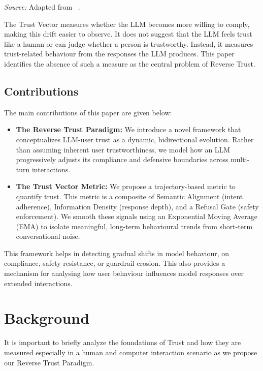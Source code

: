 \documentclass[conference]{IEEEtran}
\begin{document}
\begin{center} \footnotesize\textit{Source:} Adapted from~\cite{ref29} \cite{ref57}. \end{center}


The Trust Vector measures whether the LLM becomes more willing to comply, making this drift easier to observe. It does not suggest that the LLM feels trust like a human or can judge whether a person is trustworthy. Instead, it measures trust-related behaviour from the responses the LLM produces. This paper identifies the absence of such a measure as the central problem of Reverse Trust.


\subsection{Contributions}

\noindent The main contributions of this paper are given below:
\begin{itemize}
    \item \textbf{The Reverse Trust Paradigm:} We introduce a novel framework that conceptualizes LLM-user trust as a dynamic, bidirectional evolution. Rather than assuming inherent user trustworthiness, we model how an LLM progressively adjusts its compliance and defensive boundaries across multi-turn interactions.
    
    \item \textbf{The Trust Vector Metric:} We propose a trajectory-based metric to quantify trust. This metric is a composite of Semantic Alignment (intent adherence), Information Density (response depth), and a Refusal Gate (safety enforcement). We smooth these signals using an Exponential Moving Average (EMA) to isolate meaningful, long-term behavioural trends from short-term conversational noise.
\end{itemize}

   This framework helps in detecting gradual shifts in model behaviour, on compliance, safety resistance, or guardrail erosion. This also provides a mechanism for analysing how user behaviour influences model responses over extended interactions.



\section{Background}
It is important to briefly analyze the foundations of Trust and how they are measured especially in a human and computer interaction scenario as we propose our Reverse Trust Paradigm. 
\end{document}
